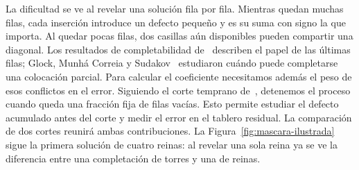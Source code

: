 La dificultad se ve al revelar una solución fila por fila. Mientras quedan muchas filas, cada
inserción introduce un defecto pequeño y es su suma con signo la que importa. Al quedar pocas
filas, dos casillas aún disponibles pueden compartir una diagonal. Los resultados de completabilidad
de~\cite{ef} describen el papel de las últimas filas;
Glock, Munhá Correia y Sudakov~\cite{gms} estudiaron cuándo puede completarse una colocación
parcial. Para calcular el coeficiente necesitamos además el peso de esos conflictos en el error.
Siguiendo el corte temprano de~\cite{ef}, detenemos el proceso cuando queda una fracción fija
de filas vacías. Esto permite estudiar el defecto acumulado antes del corte y medir el error en
el tablero residual. La comparación de dos cortes reunirá ambas contribuciones.
La Figura~\ref{fig:mascara-ilustrada} sigue la primera solución de cuatro reinas: al revelar una
sola reina ya se ve la diferencia entre una completación de torres y una de reinas.

